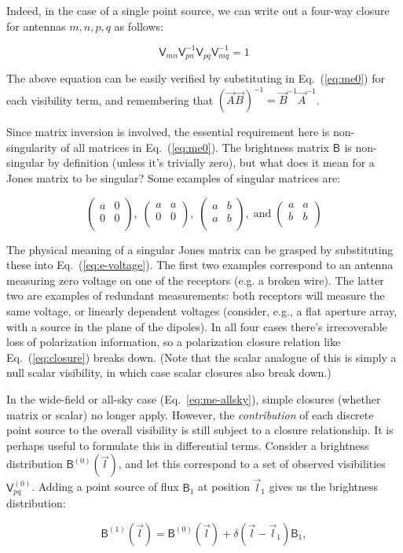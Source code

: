 \documentclass{aa}
\newcommand{\matrixtt}[4]{\left( \begin{array}{cc}#1&#2\\#3&#4\\\end{array} \right)}
\newcommand{\jones}[2]{\vec {#1}_{#2}}
\newcommand{\jonesinv}[2]{\vec {#1}^{-1}_{#2}}
\newcommand{\coh}[2]{\mathsf{{#1}}_{{#2}}}
\begin{document}
Indeed, in the case of a single point source, we can write out a four-way closure for antennas $m,n,p,q$ as follows:

\begin{equation}\label{eq:closure}
\coh{V}{mn}\coh{V}{pn}^{-1}\coh{V}{pq}\coh{V}{mq}^{-1} = 1
\end{equation}

The above equation can be easily verified by substituting in Eq.~(\ref{eq:me0}) for each visibility term, and remembering that $(\jones{A}{}\jones{B}{})^{-1}=\jonesinv{B}{}\jonesinv{A}{}$. 

Since matrix inversion is involved, the essential requirement here is non-singularity of all matrices in Eq.~(\ref{eq:me0}). The brightness matrix $\coh{B}{}$ is non-singular by definition (unless it's trivially zero), but what does it mean for a Jones matrix to be singular? Some examples of singular matrices are:

\[
\matrixtt{a}{0}{0}{0}, \; \matrixtt{a}{a}{0}{0}, \; \matrixtt{a}{b}{a}{b},\; \mathrm{and} \; \matrixtt{a}{a}{b}{b}
\]

The physical meaning of a singular Jones matrix can be grasped by substituting these into Eq.~(\ref{eq:e-voltage}). The first two examples correspond to an antenna measuring zero voltage on one of the receptors (e.g. a broken wire). The latter two are examples of redundant measurements: both receptors will measure the same voltage, or linearly dependent voltages (consider, e.g., a flat aperture array, with a source in the plane of the dipoles). In all four cases there's irrecoverable loss of polarization information, so a polarization closure relation like Eq.~(\ref{eq:closure}) breaks down. (Note that the scalar analogue of this is simply a null scalar visibility, in which case scalar closures also break down.)

In the wide-field or all-sky case (Eq.~\ref{eq:me-allsky}), simple closures (whether matrix or scalar) no longer apply. However, the \emph{contribution} of each discrete point source to the overall visibility is still subject to a closure relationship. It is perhaps useful to formulate this in differential terms. Consider a brightness distribution $\coh{B}{}^{(0)}(\vec l)$, and let this correspond to a set of observed visibilities $\coh{V}{pq}^{(0)}$. Adding a point source of flux $\coh{B}{1}$ at position $\vec l_1$ gives us the brightness distribution:

\[
\coh{B}{}^{(1)}(\vec l) = \coh{B}{}^{(0)}(\vec l)+\delta(\vec l - \vec l_1)\coh{B}{1},
\]
\end{document}
